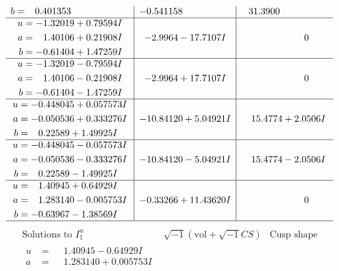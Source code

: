 \documentclass[1p]{elsarticle_modified}
\theoremstyle{definition}
\newcommand{\I}{\sqrt{-1}}
\begin{document}
$$\begin{array}{c|c|c}
\begin{aligned}
b &= \phantom{-}0.401353\phantom{ +0.000000I}\end{aligned}
 & -0.541158\phantom{ +0.000000I} & \phantom{-}31.3900\phantom{ +0.000000I} \\ \hline\begin{aligned}
u &= -1.32019 + 0.79594 I \\
a &= \phantom{-}1.40106 + 0.21908 I \\
b &= -0.61404 + 1.47259 I\end{aligned}
 & -2.9964 - 17.7107 I & \phantom{-0.000000 } 0 \\ \hline\begin{aligned}
u &= -1.32019 - 0.79594 I \\
a &= \phantom{-}1.40106 - 0.21908 I \\
b &= -0.61404 - 1.47259 I\end{aligned}
 & -2.9964 + 17.7107 I & \phantom{-0.000000 } 0 \\ \hline\begin{aligned}
u &= -0.448045 + 0.057573 I \\
a &= -0.050536 + 0.333276 I \\
b &= \phantom{-}0.22589 + 1.49925 I\end{aligned}
 & -10.84120 + 5.04921 I & \phantom{-}15.4774 + 2.0506 I \\ \hline\begin{aligned}
u &= -0.448045 - 0.057573 I \\
a &= -0.050536 - 0.333276 I \\
b &= \phantom{-}0.22589 - 1.49925 I\end{aligned}
 & -10.84120 - 5.04921 I & \phantom{-}15.4774 - 2.0506 I \\ \hline\begin{aligned}
u &= \phantom{-}1.40945 + 0.64929 I \\
a &= \phantom{-}1.283140 - 0.005753 I \\
b &= -0.63967 - 1.38569 I\end{aligned}
 & -0.33266 + 11.43620 I & \phantom{-0.000000 } 0\\
 \hline 
 \end{array}$$\newpage$$\begin{array}{c|c|c}  
\text{Solutions to }I^u_{1}& \I (\text{vol} + \sqrt{-1}CS) & \text{Cusp shape}\\
 \hline 
\begin{aligned}
u &= \phantom{-}1.40945 - 0.64929 I \\
a &= \phantom{-}1.283140 + 0.005753 I \\

\end{aligned}
\end{array}$$
\end{document}

